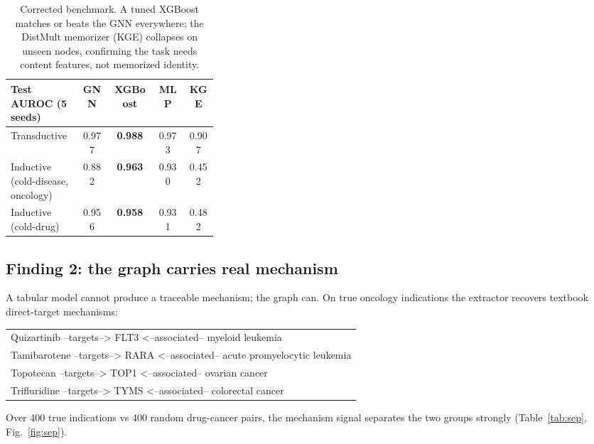 \documentclass[11pt]{article}
\begin{document}
\begin{table}[H]
\centering\small
\begin{tabular}{>{\raggedright\arraybackslash}p{0.34\linewidth} cccc}
\toprule
\rowcolor{sriblue}\color{white}\textbf{Test AUROC (5 seeds)} & \color{white}\textbf{GNN} & \color{white}\textbf{XGBoost} & \color{white}\textbf{MLP} & \color{white}\textbf{KGE}\\
\midrule
\rowcolor{srirow} Transductive & 0.977 & \textbf{0.988} & 0.973 & 0.907\\
Inductive (cold-disease, oncology) & 0.882 & \textbf{0.963} & 0.930 & 0.452\\
\rowcolor{srirow} Inductive (cold-drug) & 0.956 & \textbf{0.958} & 0.931 & 0.482\\
\bottomrule
\end{tabular}
\caption{Corrected benchmark. A tuned XGBoost matches or beats the GNN everywhere;
the DistMult memorizer (KGE) collapses on unseen nodes, confirming the task needs
content features, not memorized identity.}
\label{tab:bench}
\end{table}

\subsection{Finding 2: the graph carries real mechanism}
A tabular model cannot produce a traceable mechanism; the graph can. On true
oncology indications the extractor recovers textbook direct-target mechanisms:
\begin{center}\small\ttfamily
\begin{tabular}{l}
Quizartinib --targets--> FLT3 <--associated-- myeloid leukemia\\
Tamibarotene --targets--> RARA <--associated-- acute promyelocytic leukemia\\
Topotecan --targets--> TOP1 <--associated-- ovarian cancer\\
Trifluridine --targets--> TYMS <--associated-- colorectal cancer\\
\end{tabular}
\end{center}

Over 400 true indications vs 400 random drug-cancer pairs, the mechanism signal
separates the two groups strongly (Table~\ref{tab:sep}, Fig.~\ref{fig:sep}).
\end{document}
